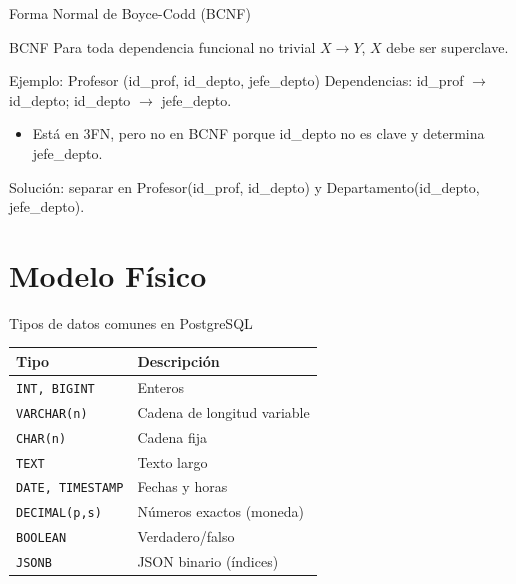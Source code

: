 \documentclass[aspectratio=169, 10pt, xcolor=table]{beamer}
\begin{document}
\begin{frame}{Forma Normal de Boyce-Codd (BCNF)}
    \begin{block}{BCNF}
        Para toda dependencia funcional no trivial $X \rightarrow Y$, $X$ debe ser superclave.
    \end{block}
    \begin{exampleblock}{Ejemplo: Profesor (id\_prof, id\_depto, jefe\_depto)}
        Dependencias: id\_prof $\rightarrow$ id\_depto; id\_depto $\rightarrow$ jefe\_depto.
        \begin{itemize}
            \item Está en 3FN, pero no en BCNF porque id\_depto no es clave y determina jefe\_depto.
        \end{itemize}
        Solución: separar en Profesor(id\_prof, id\_depto) y Departamento(id\_depto, jefe\_depto).
    \end{exampleblock}
\end{frame}

\section{Modelo Físico}

\begin{frame}{Tipos de datos comunes en PostgreSQL}
    \begin{table}
        \centering
        \begin{tabular}{l|l}
            \toprule
            Tipo & Descripción \\
            \midrule
            \texttt{INT, BIGINT} & Enteros \\
            \texttt{VARCHAR(n)} & Cadena de longitud variable \\
            \texttt{CHAR(n)} & Cadena fija \\
            \texttt{TEXT} & Texto largo \\
            \texttt{DATE, TIMESTAMP} & Fechas y horas \\
            \texttt{DECIMAL(p,s)} & Números exactos (moneda) \\
            \texttt{BOOLEAN} & Verdadero/falso \\
            \texttt{JSONB} & JSON binario (índices) \\
            \bottomrule
        \end{tabular}
    \end{table}
\end{frame}
\end{document}
